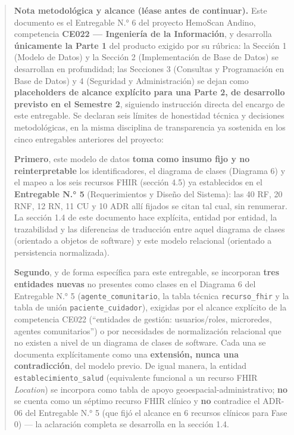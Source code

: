 \documentclass[11pt,a4paper]{article}
\begin{document}
\begin{quote}
\textbf{Nota metodológica y alcance (léase antes de continuar).} Este documento es el Entregable N.° 6 del proyecto HemoScan Andino, competencia \textbf{CE022 --- Ingeniería de la Información}, y desarrolla \textbf{únicamente la Parte 1} del producto exigido por su rúbrica: la Sección 1 (Modelo de Datos) y la Sección 2 (Implementación de Base de Datos) se desarrollan en profundidad; las Secciones 3 (Consultas y Programación en Base de Datos) y 4 (Seguridad y Administración) se dejan como \textbf{placeholders de alcance explícito para una Parte 2, de desarrollo previsto en el Semestre 2}, siguiendo instrucción directa del encargo de este entregable. Se declaran seis límites de honestidad técnica y decisiones metodológicas, en la misma disciplina de transparencia ya sostenida en los cinco entregables anteriores del proyecto:

\textbf{Primero}, este modelo de datos \textbf{toma como insumo fijo y no reinterpretable} los identificadores, el diagrama de clases (Diagrama 6) y el mapeo a los seis recursos FHIR (sección 4.5) ya establecidos en el \textbf{Entregable N.° 5} (Requerimientos y Diseño del Sistema): las 40 RF, 20 RNF, 12 RN, 11 CU y 10 ADR allí fijados se citan tal cual, sin renumerar. La sección 1.4 de este documento hace explícita, entidad por entidad, la trazabilidad y las diferencias de traducción entre aquel diagrama de clases (orientado a objetos de software) y este modelo relacional (orientado a persistencia normalizada).

\textbf{Segundo}, y de forma específica para este entregable, se incorporan \textbf{tres entidades nuevas} no presentes como clases en el Diagrama 6 del Entregable N.° 5 (\texttt{agente\_comunitario}, la tabla técnica \texttt{recurso\_fhir} y la tabla de unión \texttt{paciente\_cuidador}), exigidas por el alcance explícito de la competencia CE022 (``entidades de gestión: usuarios/roles, microredes, agentes comunitarios'') o por necesidades de normalización relacional que no existen a nivel de un diagrama de clases de software. Cada una se documenta explícitamente como una \textbf{extensión, nunca una contradicción}, del modelo previo. De igual manera, la entidad \texttt{establecimiento\_salud} (equivalente funcional a un recurso FHIR \emph{Location}) se incorpora como tabla de apoyo geoespacial-administrativo; \textbf{no} se cuenta como un séptimo recurso FHIR clínico y \textbf{no} contradice el ADR-06 del Entregable N.° 5 (que fijó el alcance en 6 recursos clínicos para Fase 0) --- la aclaración completa se desarrolla en la sección 1.4.


\end{quote}
\end{document}
